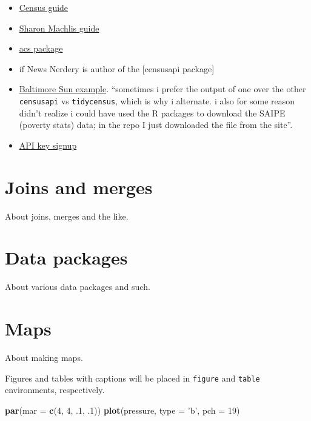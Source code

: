 \documentclass[]{book}
\newenvironment{Shaded}{\begin{snugshade}}{\end{snugshade}}
\newcommand{\KeywordTok}[1]{\textcolor[rgb]{0.13,0.29,0.53}{\textbf{#1}}}
\newcommand{\DataTypeTok}[1]{\textcolor[rgb]{0.13,0.29,0.53}{#1}}
\newcommand{\DecValTok}[1]{\textcolor[rgb]{0.00,0.00,0.81}{#1}}
\newcommand{\StringTok}[1]{\textcolor[rgb]{0.31,0.60,0.02}{#1}}
\newcommand{\NormalTok}[1]{#1}
\providecommand{\tightlist}{%
  \setlength{\itemsep}{0pt}\setlength{\parskip}{0pt}}
\begin{document}
\begin{itemize}
\tightlist
\item
  \href{https://rconsortium.github.io/censusguide/}{Census guide}
\item
  \href{https://www.computerworld.com/article/3120415/data-analytics/how-to-download-new-census-data-with-r.html}{Sharon
  Machlis guide}
\item
  \href{https://cran.r-project.org/web/packages/acs/README.html}{acs
  package}
\item
  \citet{hrecht} if News Nerdery is author of the {[}censusapi
  package{]}
\item
  \href{https://github.com/baltimore-sun-data/census-data-analysis-2018}{Baltimore
  Sun example}. ``sometimes i prefer the output of one over the other
  \texttt{censusapi} vs \texttt{tidycensus}, which is why i alternate. i
  also for some reason didn't realize i could have used the R packages
  to download the SAIPE (poverty stats) data; in the repo I just
  downloaded the file from the site''.
\item
  \href{http://api.census.gov/data/key_signup.html}{API key signup}
\end{itemize}

\chapter{Joins and merges}\label{joins}

About joins, merges and the like.

\chapter{Data packages}\label{data}

About various data packages and such.

\chapter{Maps}\label{maps}

About making maps.

Figures and tables with captions will be placed in \texttt{figure} and
\texttt{table} environments, respectively.

\begin{Shaded}
\begin{Highlighting}[]
\KeywordTok{par}\NormalTok{(}\DataTypeTok{mar =} \KeywordTok{c}\NormalTok{(}\DecValTok{4}\NormalTok{, }\DecValTok{4}\NormalTok{, .}\DecValTok{1}\NormalTok{, .}\DecValTok{1}\NormalTok{))}
\KeywordTok{plot}\NormalTok{(pressure, }\DataTypeTok{type =} \StringTok{'b'}\NormalTok{, }\DataTypeTok{pch =} \DecValTok{19}\NormalTok{)}
\end{Highlighting}
\end{Shaded}
\end{document}
